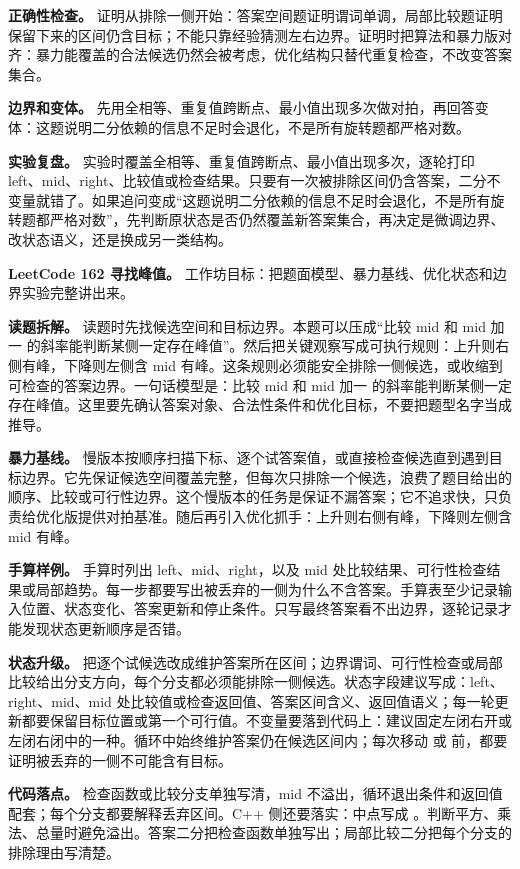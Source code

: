 \textbf{正确性检查。} 证明从排除一侧开始：答案空间题证明谓词单调，局部比较题证明保留下来的区间仍含目标；不能只靠经验猜测左右边界。证明时把算法和暴力版对齐：暴力能覆盖的合法候选仍然会被考虑，优化结构只替代重复检查，不改变答案集合。

\textbf{边界和变体。} 先用全相等、重复值跨断点、最小值出现多次做对拍，再回答变体：这题说明二分依赖的信息不足时会退化，不是所有旋转题都严格对数。

\textbf{实验复盘。} 实验时覆盖全相等、重复值跨断点、最小值出现多次，逐轮打印 left、mid、right、比较值或检查结果。只要有一次被排除区间仍含答案，二分不变量就错了。如果追问变成“这题说明二分依赖的信息不足时会退化，不是所有旋转题都严格对数”，先判断原状态是否仍然覆盖新答案集合，再决定是微调边界、改状态语义，还是换成另一类结构。

\noindent\textbf{LeetCode 162 寻找峰值。} 工作坊目标：把题面模型、暴力基线、优化状态和边界实验完整讲出来。

\textbf{读题拆解。} 读题时先找候选空间和目标边界。本题可以压成“比较 mid 和 mid 加一 的斜率能判断某侧一定存在峰值”。然后把关键观察写成可执行规则：上升则右侧有峰，下降则左侧含 mid 有峰。这条规则必须能安全排除一侧候选，或收缩到可检查的答案边界。一句话模型是：比较 mid 和 mid 加一 的斜率能判断某侧一定存在峰值。这里要先确认答案对象、合法性条件和优化目标，不要把题型名字当成推导。

\textbf{暴力基线。} 慢版本按顺序扫描下标、逐个试答案值，或直接检查候选直到遇到目标边界。它先保证候选空间覆盖完整，但每次只排除一个候选，浪费了题目给出的顺序、比较或可行性边界。这个慢版本的任务是保证不漏答案；它不追求快，只负责给优化版提供对拍基准。随后再引入优化抓手：上升则右侧有峰，下降则左侧含 mid 有峰。

\textbf{手算样例。} 手算时列出 left、mid、right，以及 mid 处比较结果、可行性检查结果或局部趋势。每一步都要写出被丢弃的一侧为什么不含答案。手算表至少记录输入位置、状态变化、答案更新和停止条件。只写最终答案看不出边界，逐轮记录才能发现状态更新顺序是否错。

\textbf{状态升级。} 把逐个试候选改成维护答案所在区间；边界谓词、可行性检查或局部比较给出分支方向，每个分支都必须能排除一侧候选。状态字段建议写成：left、right、mid、mid 处比较值或检查返回值、答案区间含义、返回值语义；每一轮更新都要保留目标位置或第一个可行值。不变量要落到代码上：建议固定左闭右开或左闭右闭中的一种。循环中始终维护答案仍在候选区间内；每次移动  或  前，都要证明被丢弃的一侧不可能含有目标。

\textbf{代码落点。} 检查函数或比较分支单独写清，mid 不溢出，循环退出条件和返回值配套；每个分支都要解释丢弃区间。C++ 侧还要落实：中点写成 。判断平方、乘法、总量时避免溢出。答案二分把检查函数单独写出；局部比较二分把每个分支的排除理由写清楚。


